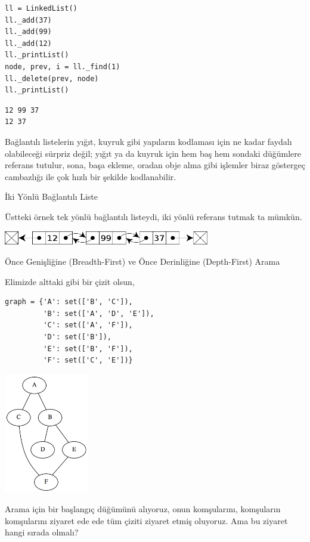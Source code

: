 \documentclass[12pt,fleqn]{article}\usepackage{../../common}
\begin{document}
\begin{verbatim}
ll = LinkedList()
ll._add(37)
ll._add(99)
ll._add(12)
ll._printList()
node, prev, i = ll._find(1)
ll._delete(prev, node)
ll._printList()
\end{verbatim}

\begin{verbatim}
12 99 37
12 37
\end{verbatim}

Bağlantılı listelerin yığıt, kuyruk gibi yapıların kodlaması için ne kadar
faydalı olabileceği sürpriz değil; yığıt ya da kuyruk için hem baş hem
sondaki düğümlere referans tutulur, sona, başa ekleme, oradan obje alma
gibi işlemler biraz göstergeç cambazlığı ile çok hızlı bir şekilde kodlanabilir.

İki Yönlü Bağlantılı Liste

Üstteki örnek tek yönlü bağlantılı listeydi, iki yönlü referans tutmak ta
mümkün. 

\includegraphics[width=9cm]{basic_05.png}

Önce Genişliğine (Breadth-First) ve Önce Derinliğine (Depth-First) Arama

Elimizde alttaki gibi bir çizit olsun, 

\begin{verbatim}
graph = {'A': set(['B', 'C']),
         'B': set(['A', 'D', 'E']),
         'C': set(['A', 'F']),
         'D': set(['B']),
         'E': set(['B', 'F']),
         'F': set(['C', 'E'])}
\end{verbatim}

\includegraphics[width=10em]{graph.png}

Arama için bir başlangıç düğümünü alıyoruz, onun komşularını, komşuların
komşularını ziyaret ede ede tüm çiziti ziyaret etmiş oluyoruz. Ama bu
ziyaret hangi sırada olmalı?
\end{document}
